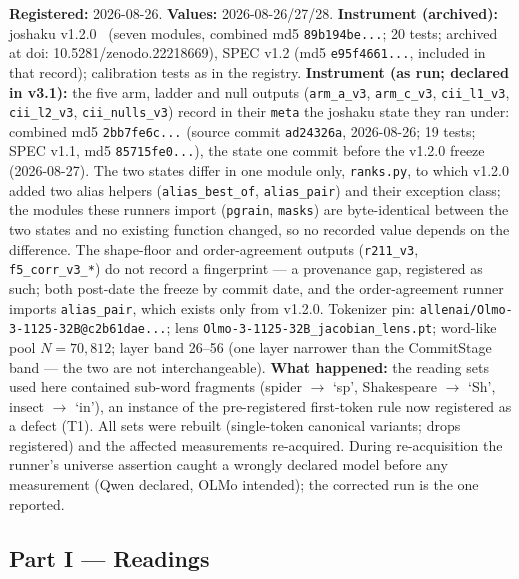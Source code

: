 \documentclass[11pt]{article}
\begin{document}
\noindent\textbf{Registered:} 2026-08-26. \textbf{Values:} 2026-08-26/27/28.
\textbf{Instrument (archived):} joshaku v1.2.0~\cite{joshaku2026} (seven
modules, combined md5 \texttt{89b194be...}; 20 tests; archived at doi:
10.5281/zenodo.22218669), SPEC v1.2 (md5 \texttt{e95f4661...}, included in
that record); calibration tests as in the registry.
\textbf{Instrument (as run; declared in v3.1):} the five arm, ladder and
null outputs (\texttt{arm\_a\_v3}, \texttt{arm\_c\_v3}, \texttt{cii\_l1\_v3},
\texttt{cii\_l2\_v3}, \texttt{cii\_nulls\_v3}) record in their \texttt{meta}
the joshaku state they ran under: combined md5 \texttt{2bb7fe6c...} (source
commit \texttt{ad24326a}, 2026-08-26; 19 tests; SPEC v1.1, md5
\texttt{85715fe0...}), the state one commit before the v1.2.0 freeze
(2026-08-27). The two states differ in one module only, \texttt{ranks.py},
to which v1.2.0 added two alias helpers (\texttt{alias\_best\_of},
\texttt{alias\_pair}) and their exception class; the modules these runners import (\texttt{pgrain},
\texttt{masks}) are byte-identical between the two states and no existing
function changed, so no recorded value depends on the difference. The
shape-floor and order-agreement outputs (\texttt{r211\_v3},
\texttt{f5\_corr\_v3\_*}) do not record a fingerprint --- a provenance gap,
registered as such; both post-date the freeze by commit date, and the
order-agreement runner imports \texttt{alias\_pair}, which exists only from
v1.2.0. Tokenizer pin:
\texttt{allenai/}\allowbreak\texttt{Olmo-3-1125-32B}\allowbreak\texttt{@c2b61dae...}; lens
\texttt{Olmo-3-1125-32B\_jacobian\_lens.pt}; word-like pool $N = 70{,}812$;
layer band 26--56 (one layer narrower than the CommitStage band --- the two
are not interchangeable).
\textbf{What happened:} the reading sets used here contained sub-word
fragments (spider $\to$ `sp', Shakespeare $\to$ `Sh', insect $\to$ `in'),
an instance of the pre-registered first-token rule now registered as a
defect (T1). All sets were rebuilt (single-token canonical variants; drops
registered) and the affected measurements re-acquired. During
re-acquisition the runner's universe assertion caught a wrongly declared
model before any measurement (Qwen declared, OLMo intended); the corrected
run is the one reported.

\subsection*{Part I --- Readings}
\end{document}
